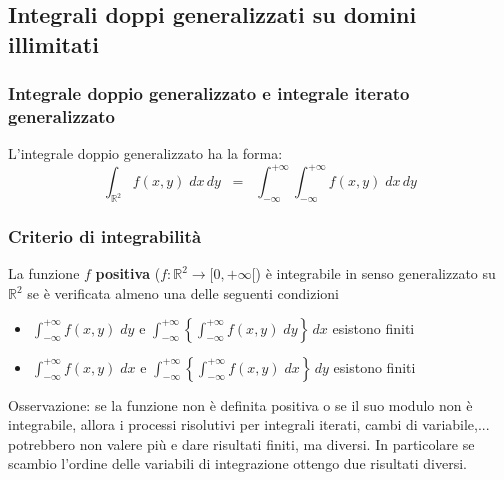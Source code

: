 \documentclass[a4paper]{article}
\newcommand\Rd{\mathbb{R}^2}  %
\begin{document}
\newpage

\subsection{Integrali doppi generalizzati su domini illimitati}
\subsubsection*{Integrale doppio generalizzato e integrale iterato generalizzato}
L'integrale doppio generalizzato ha la forma:
\[\int_{\Rd} f(x,y) \; dx \, dy \;\; = \;\; \int_{-\infty}^{+\infty} \int_{-\infty}^{+\infty} f(x,y) \; dx \, dy\]

\subsubsection*{Criterio di integrabilità}
La funzione \(f\) \textbf{positiva} (\(f: \Rd \to [0,+\infty[\)) è integrabile in senso generalizzato su \(\Rd\) se è verificata
almeno una delle seguenti condizioni
\begin{itemize}
	\item[1.] \(\displaystyle \int_{-\infty}^{+\infty} f(x,y) \; dy\) e \(\displaystyle \int_{-\infty}^{+\infty} \left\{\int_{-\infty}^{+\infty} f(x,y) \; dy\right\} \, dx\) esistono finiti
	\item[2.] \(\displaystyle \int_{-\infty}^{+\infty} f(x,y) \; dx\) e \(\displaystyle \int_{-\infty}^{+\infty} \left\{\int_{-\infty}^{+\infty} f(x,y) \; dx\right\} \, dy\) esistono finiti
\end{itemize}
Osservazione: se la funzione non è definita positiva o se il suo modulo non è integrabile, allora i processi risolutivi per
integrali iterati, cambi di variabile,... potrebbero non valere più e dare risultati finiti, ma diversi. In particolare se
scambio l'ordine delle variabili di integrazione ottengo due risultati diversi.
\end{document}
